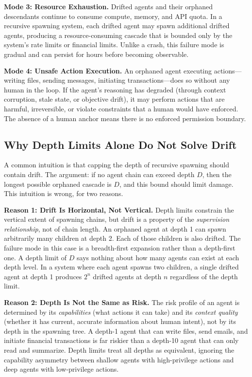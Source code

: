 \medskip\noindent\textbf{Mode 3: Resource Exhaustion.}
Drifted agents and their orphaned descendants continue to consume compute, memory, and API quota. In a recursive spawning system, each drifted agent may spawn additional drifted agents, producing a resource-consuming cascade that is bounded only by the system's rate limits or financial limits. Unlike a crash, this failure mode is gradual and can persist for hours before becoming observable.

\medskip\noindent\textbf{Mode 4: Unsafe Action Execution.}
An orphaned agent executing actions—writing files, sending messages, initiating transactions—does so without any human in the loop. If the agent's reasoning has degraded (through context corruption, stale state, or objective drift), it may perform actions that are harmful, irreversible, or violate constraints that a human would have enforced. The absence of a human anchor means there is no enforced permission boundary.

\subsection{Why Depth Limits Alone Do Not Solve Drift}

A common intuition is that capping the depth of recursive spawning should contain drift. The argument: if no agent chain can exceed depth $D$, then the longest possible orphaned cascade is $D$, and this bound should limit damage. This intuition is wrong, for two reasons.

\medskip\noindent\textbf{Reason 1: Drift Is Horizontal, Not Vertical.}
Depth limits constrain the vertical extent of spawning chains, but drift is a property of the \emph{supervision relationship}, not of chain length. An orphaned agent at depth 1 can spawn arbitrarily many children at depth 2. Each of those children is also drifted. The failure mode in this case is a breadth-first expansion rather than a depth-first one. A depth limit of $D$ says nothing about how many agents can exist at each depth level. In a system where each agent spawns two children, a single drifted agent at depth 1 produces $2^n$ drifted agents at depth $n$ regardless of the depth limit.

\medskip\noindent\textbf{Reason 2: Depth Is Not the Same as Risk.}
The risk profile of an agent is determined by its \emph{capabilities} (what actions it can take) and its \emph{context quality} (whether it has current, accurate information about human intent), not by its depth in the spawning tree. A depth-1 agent that can write files, send emails, and initiate financial transactions is far riskier than a depth-10 agent that can only read and summarize. Depth limits treat all depths as equivalent, ignoring the capability asymmetry between shallow agents with high-privilege actions and deep agents with low-privilege actions.

